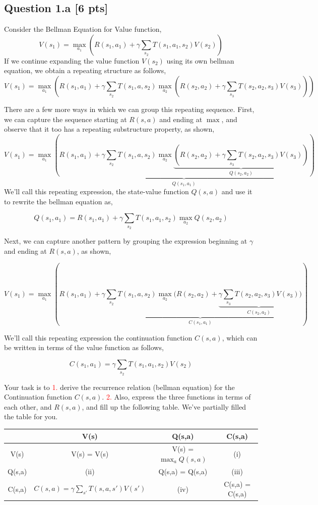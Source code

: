 \documentclass[12pt]{article}
\begin{document}
\subsection*{Question 1.a \textbf{[6 pts]}} Consider the Bellman Equation for Value function,
$$
    V(s_1) = \max_{a_1} \left( R(s_1,a_1) + \gamma \sum_{s_2}T(s_1, a_1, s_2)V(s_2) \right)
$$
If we continue expanding the value function $V(s_2)$ using its own bellman equation, we obtain a repeating structure as follows,
$$
     V(s_1) = \max_{a_1} \left( R(s_1,a_1) + \gamma \sum_{s_2}T(s_1, a, s_2) \max_{a_2} \left( R(s_2,a_2) + \gamma \sum_{s_3}T(s_2, a_2, s_3)V(s_3) \right) \right)
$$

There are a few more ways in which we can group this repeating sequence. First, we can capture the sequence starting at $R(s,a)$ and ending at $\max$, and observe that it too has a repeating substructure property, as shown,
$$
     V(s_1) = \max_{a_1} \underbrace {\left( R(s_1,a_1) + \gamma \sum_{s_2}T(s_1, a, s_2) \max_{a_2} \underbrace{\left( R(s_2,a_2) + \gamma \sum_{s_3}T(s_2, a_2, s_3)V(s_3) \right)}_{Q(s_2,a_2)} \right)}_{Q(s_1,a_1)}
$$
We'll call this repeating expression, the state-value function $Q(s,a)$ and use it to rewrite the bellman equation as,

$$
    Q(s_1,a_1) = R(s_1,a_1) + \gamma \sum_{s_2}T(s_1, a_1, s_2)\max_{a_2} Q(s_2, a_2)
$$

Next, we can capture another pattern by grouping the expression beginning at $\gamma$ and ending at $R(s,a)$, as shown,

$$
     V(s_1) = \max_{a_1} \left( R(s_1,a_1) + \underbrace{\gamma \sum_{s_2}T(s_1, a, s_2) \max_{a_2} \bigg( R(s_2,a_2) + \underbrace{\gamma \sum_{s_3}T(s_2, a_2, s_3)V(s_3)}_{C(s_2,a_2)}}_{C(s_1,a_1)} \bigg) \right)
$$

We'll call this repeating expression the continuation function $C(s,a)$, which can be written in terms of the value function as follows,

$$
    C(s_1,a_1) = \gamma\sum_{s_2}T(s_1,a_1,s_2)V(s_2)
$$

Your task is to \textcolor{red}{1.} derive the recurrence relation (bellman equation) for the Continuation function $C(s,a)$. \textcolor{red}{2.} Also, express the three functions in terms of each other, and $R(s,a)$, and fill up the following table. We've partially filled the table for you. 

\begin{center}
\begin{tabular}{ | c | c | c | c | }
 \hline
  & V(s) & Q(s,a) & C(s,a) \\ 
 \hline
 V(s) & V(s) = V(s)  & V(s) = $\max_{a} Q(s,a)$ & (i) \\  
 \hline
 Q(s,a) & (ii) & Q(s,a) = Q(s,a) & (iii)  \\
 \hline
 C(s,a) & $C(s,a) = \gamma\sum_{s'}T(s,a,s')V(s')$ & (iv) & C(s,a) = C(s,a)  \\
 \hline
\end{tabular}
\end{center}
\end{document}
